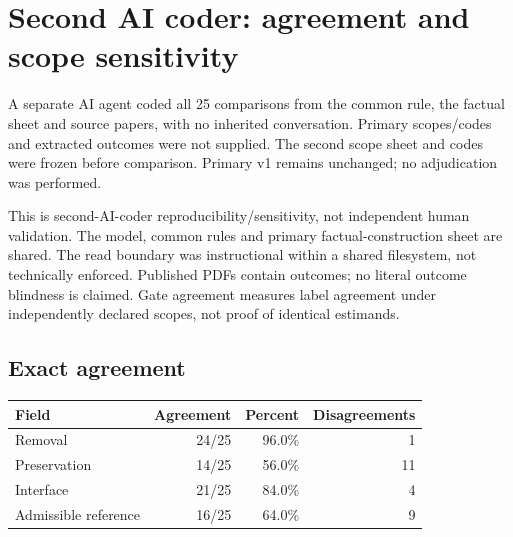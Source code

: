 \documentclass[10pt]{article}
\begin{document}
\section*{Second AI coder: agreement and scope sensitivity}
A separate AI agent coded all 25 comparisons from the common rule, the factual sheet and source papers, with no inherited conversation. Primary scopes/codes and extracted outcomes were not supplied. The second scope sheet and codes were frozen before comparison. Primary v1 remains unchanged; no adjudication was performed.
\par\medskip
This is second-AI-coder reproducibility/sensitivity, not independent human validation. The model, common rules and primary factual-construction sheet are shared. The read boundary was instructional within a shared filesystem, not technically enforced. Published PDFs contain outcomes; no literal outcome blindness is claimed. Gate agreement measures label agreement under independently declared scopes, not proof of identical estimands.
\subsection*{Exact agreement}
\begin{tabular}{lrrr}\toprule Field & Agreement & Percent & Disagreements \\ \midrule
Removal & 24/25 & 96.0\% & 1 \\
Preservation & 14/25 & 56.0\% & 11 \\
Interface & 21/25 & 84.0\% & 4 \\
Admissible reference & 16/25 & 64.0\% & 9 \\
\bottomrule\end{tabular}
\end{document}
